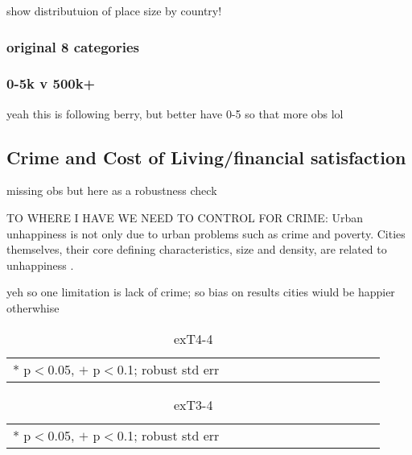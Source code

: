 \documentclass[10pt, letterpaper]{article}
\begin{document}
\begin{spacing}{1.4}
show distributuion of place size by country!

\subsubsection{original 8 categories}
\subsubsection{0-5k v 500k+}
yeah this is following berry, but better have 0-5 so that more obs lol

\subsection{Crime and Cost of Living/financial satisfaction}
missing obs but here as a robustness check

TO WHERE I HAVE WE NEED TO CONTROL FOR CRIME:
Urban unhappiness is not only due
to urban problems such as crime and poverty.  Cities themselves, their core
defining characteristics, size and density, are related to unhappiness
\citep{aok_brfss_city_cize16}. 


yeh so one limitation is lack of crime; so bias on results cities wiuld be happier otherwhise

\begin{spacing}{.9} \begin{table}[H]\centering \caption{.} \label{d1} \begin{scriptsize} \begin{tabular}{p{1.8in}p{.5in}p{.5in}p{.5in}p{.5in}p{.5in}p{.5in}p{.5in}p{.5in}p{.5in}p{.5 in}p{.5in}p{.5 in}}\hline  \hline   * p$<$0.05, $+$ p$<$0.1; robust std err \end{tabular}\end{scriptsize}\caption{exT4-4}\end{table} \end{spacing}

\begin{spacing}{.9} \begin{table}[H]\centering \caption{.} \label{d1} \begin{scriptsize} \begin{tabular}{p{1.8in}p{.5in}p{.5in}p{.5in}p{.5in}p{.5in}p{.5in}p{.5in}p{.5in}p{.5in}p{.5 in}p{.5in}p{.5 in}}\hline  \hline   * p$<$0.05, $+$ p$<$0.1; robust std err \end{tabular}\end{scriptsize}\caption{exT3-4}\end{table} \end{spacing}


\end{spacing}
\end{document}
